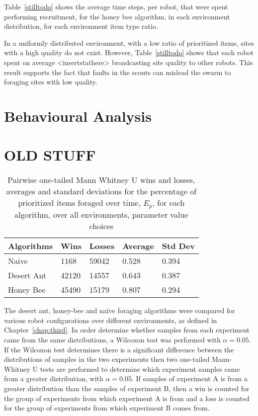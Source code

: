 Table~\ref{stilltodo} shows the average time steps, per robot, that were spent performing recruitment, for the honey bee algorithm, in each environment distribution, for each environment item type ratio. 

In a uniformly distributed environment, with a low ratio of prioritized items, sites with a high quality do not exist. However, Table~\ref{stilltodo} shows that each robot spent on average <insertstathere> broadcasting site quality to other robots. This result supports the fact that faults in the scouts can mislead the swarm to foraging sites with low quality.

\section{Behavioural Analysis}
\label{results:behaviouralanalysis}



\section{OLD STUFF}

\begin{table}
\centering
    \caption{Pairwise one-tailed Mann Whitney U wins and losses, averages and standard deviations for the percentage of prioritized items foraged over time, $E_p$, for each algorithm, over all environments, parameter value choices }
        \label{summarytable}
    \begin{tabular}{l|llll}
    \hline \hline
    Algorithms & Wins & Losses & Average & Std Dev \\ \hline
    Naive      & 1168    & 59042 & 0.528   & 0.394  \\
    Desert Ant  & 42120 & 14557 & 0.643   & 0.387  \\
    Honey Bee   & 45490 & 15179 & 0.807   & 0.294  \\
    \hline
    \end{tabular}
\end{table}

The desert ant, honey-bee and na\"ive foraging algorithms were compared for various robot configurations over different environments, as defined in Chapter~\ref{chap:third}. In order determine whether samples from each experiment came from the same distributions, a Wilcoxon test was performed with $\alpha=0.05$. If the Wilcoxon test determines there is a significant difference between the distributions of samples in the two experiments then two one-tailed Mann-Whitney U tests are performed to determine which experiment samples came from a greater distribution, with $\alpha=0.05$. If samples of experiment A is from a greater distribution than the samples of experiment B, then a win is counted for the group of experiments from which experiment A is from and a loss is counted for the group of experiments from which experiment B comes from. 

